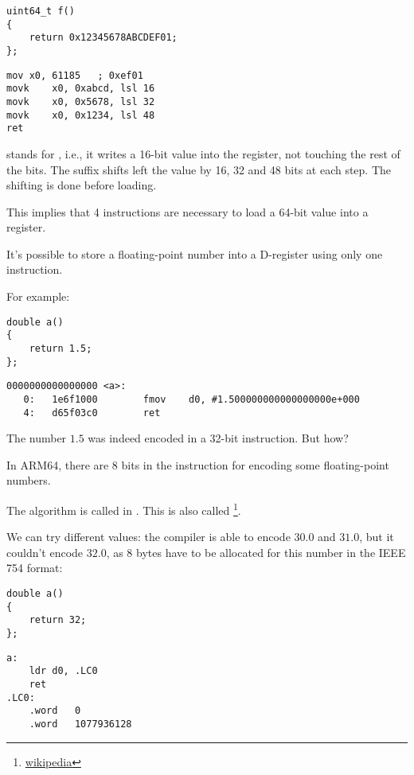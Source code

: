 
\begin{lstlisting}
uint64_t f()
{
	return 0x12345678ABCDEF01;
};
\end{lstlisting}

\begin{lstlisting}[caption=GCC 4.9.1 -O3]
mov	x0, 61185   ; 0xef01
movk	x0, 0xabcd, lsl 16
movk	x0, 0x5678, lsl 32
movk	x0, 0x1234, lsl 48
ret
\end{lstlisting}

 stands for , i.e., it writes a 16-bit value into the register, not touching the rest of the bits.
The  suffix shifts left the value by 16, 32 and 48 bits at each step. The shifting is done before loading.

This implies that 4 instructions are necessary to load a 64-bit value into a register.


It's possible to store a floating-point number into a D-register using only one instruction.

For example:

\begin{lstlisting}
double a()
{
	return 1.5;
};
\end{lstlisting}

\begin{lstlisting}[caption=GCC 4.9.1 -O3 + objdump]
0000000000000000 <a>:
   0:   1e6f1000        fmov    d0, #1.500000000000000000e+000
   4:   d65f03c0        ret
\end{lstlisting}

The number $1.5$ was indeed encoded in a 32-bit instruction.
But how?

In ARM64, there are 8 bits in the  instruction for encoding some floating-point numbers.

The algorithm is called  in \ARMSixFourRefURL.
This is also called \footnote{\href{http://go.yurichev.com/17139}{wikipedia}}.

We can try different values: the compiler is able to encode $30.0$ and $31.0$, but it couldn't encode $32.0$,
as 8 bytes have to be allocated for this number in the IEEE 754 format:

\begin{lstlisting}
double a()
{
	return 32;
};
\end{lstlisting}

\begin{lstlisting}[caption=GCC 4.9.1 -O3]
a:
	ldr	d0, .LC0
	ret
.LC0:
	.word	0
	.word	1077936128
\end{lstlisting}
